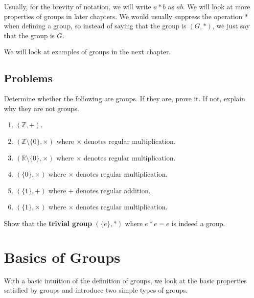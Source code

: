 \newpage

Usually, for the brevity of notation, we will write $a \ast b$ as $ab$. We will look at more properties of groups in later chapters. We would usually suppress the operation $\ast$ when defining a group, so instead of saying that the group is $(G, \ast)$, we just say that the group is $G$.

We will look at examples of groups in the next chapter.

\newpage

\section{Problems}
\begin{problem}
Determine whether the following are groups. If they are, prove it. If not, explain why they are not groups.
\begin{enumerate}[label=(\alph*)]
    \item $(\mathbb{Z}, +)$.
    \item $(\mathbb{Z} \setminus \{0\}, \times)$ where $\times$ denotes regular multiplication.
    \item $(\mathbb{R} \setminus \{0\}, \times)$ where $\times$ denotes regular multiplication.
    \item $(\{0\}, \times)$ where $\times$ denotes regular multiplication.
    \item $(\{1\}, +)$ where $+$ denotes regular addition.
    \item $(\{1\}, \times)$ where $\times$ denotes regular multiplication.
\end{enumerate}
\end{problem}

\begin{problem}
    Show that the \textbf{trivial group} $(\{e\}, *)$ where $e \ast e = e$ is indeed a group.
\end{problem}

\chapter{Basics of Groups}
With a basic intuition of the definition of groups, we look at the basic properties satisfied by groups and introduce two simple types of groups.

